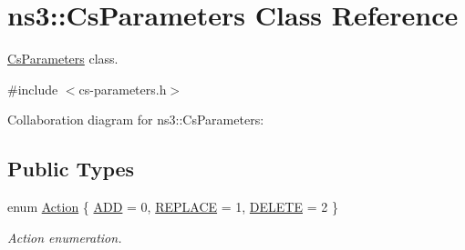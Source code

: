 \hypertarget{classns3_1_1CsParameters}{}\section{ns3\+:\+:Cs\+Parameters Class Reference}
\label{classns3_1_1CsParameters}


\hyperlink{classns3_1_1CsParameters}{Cs\+Parameters} class.  




{\ttfamily \#include $<$cs-\/parameters.\+h$>$}



Collaboration diagram for ns3\+:\+:Cs\+Parameters\+:
\subsection*{Public Types}
\begin{DoxyCompactItemize}
\item 
enum \hyperlink{classns3_1_1CsParameters_a0d81108fb3effa0924cf6c34adabb99b}{Action} \{ \hyperlink{classns3_1_1CsParameters_a0d81108fb3effa0924cf6c34adabb99ba4c90e82b7a0eed2869bd44a106385a43}{A\+DD} = 0, 
\hyperlink{classns3_1_1CsParameters_a0d81108fb3effa0924cf6c34adabb99ba37b991b448dd478d84e5ff72b625f8c6}{R\+E\+P\+L\+A\+CE} = 1, 
\hyperlink{classns3_1_1CsParameters_a0d81108fb3effa0924cf6c34adabb99ba79c5af78b72e0c063664a3fe3496cedf}{D\+E\+L\+E\+TE} = 2
 \}\begin{DoxyCompactList}\small\item\em Action enumeration. \end{DoxyCompactList}
\end{DoxyCompactItemize}
